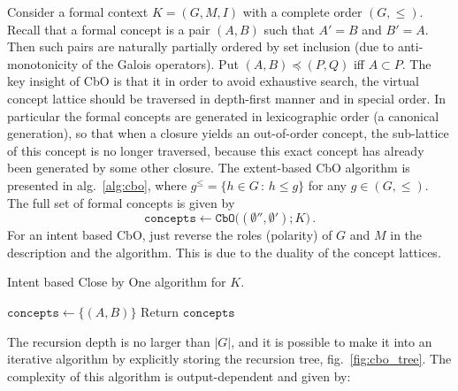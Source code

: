 \documentclass[a4paper]{article}
\begin{document}
\noindent Consider a formal context $K=(G, M, I)$ with a complete order
$(G, \leq)$. Recall that a formal concept is a pair $(A, B)$ such that $A'=B$ and
$B'=A$. Then such pairs are naturally partially ordered by set inclusion (due to
anti-monotonicity of the Galois operators). Put $(A, B) \preceq (P, Q)$ iff $A\subset P$.
The key insight of CbO is that it in order to avoid exhaustive search, the virtual
concept lattice should be traversed in depth-first manner and in special order. In
particular the formal concepts are generated in lexicographic order (a canonical
generation), so that when a closure yields an out-of-order concept, the sub-lattice
of this concept is no longer traversed, because this exact concept has already been
generated by some other closure. The extent-based CbO algorithm is presented in
alg.~\ref{alg:cbo}, where $g^\leq = \{h\in G\,:\,h\leq g\}$ for any $g\in (G, \leq)$.
The full set of formal concepts is given by
$$ \mathtt{concepts}
    \leftarrow \mathtt{CbO}\bigl((\emptyset'', \emptyset'); K\bigr)
    \,. $$
For an intent based CbO, just reverse the roles (polarity) of $G$ and $M$ in the
description and the algorithm. This is due to the duality of the concept lattices.
\begin{algorithm}
    \caption{Intent based Close by One algorithm for $K$.}\label{alg:cbo}
    \BlankLine
    $\mathtt{concepts} \leftarrow \{(A, B)\}$\;
    Return $\mathtt{concepts}$\;
\end{algorithm}
The recursion depth is no larger than $|G|$, and it is possible to make it into an
iterative algorithm by explicitly storing the recursion tree, fig.~\ref{fig:cbo_tree}.
The complexity of this algorithm is output-dependent and given by:
\end{document}
